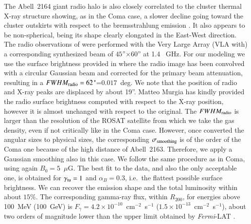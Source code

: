 \documentclass[traditabstract]{aa}
\begin{document}
The Abell~2164 giant radio halo is also closely correlated to the cluster thermal X-ray structure showing, as in the Coma case, a slower decline going toward the cluster outskirts with respect to the bremsstrahlung emission \citep{2001A&A...373..106F}. It also appears to be non-spherical, being its shape clearly elongated in the East-West direction. The radio observations of \cite{2001A&A...373..106F} were performed with the Very Large Array (VLA with) a corresponding synthesized beam of $45$''$\times60$'' at 1.4 ~GHz. For our modeling we use the surface brightness provided in \cite{2009A&A...499..679M} where the radio image has been convolved with a circular Gaussian beam and corrected for the primary beam attenuation, resulting in a $FWHM_{\rm{radio}}=62$"=$0.017$~deg. We note that the position of radio and X-ray peaks are displaced by about 19''. Matteo Murgia has kindly provided the radio surface brightness computed with respect to the \cite{2002ApJ...567..716R} X-ray position, however it is almost unchanged with respect to the original. The $FWHM_{\rm{radio}}$ is larger than the resolution of the ROSAT satellite from which we take the gas density, even if not critically like in the Coma case. However, once converted the angular sizes to physical sizes, the corresponding $\sigma_{\rm{smoothing}}$ is of the order of the Coma one because of the high distance of Abell~2163. Therefore, we apply a Gaussian smoothing also in this case. We follow the same procedure as in Coma, using again $B_{0}=5$~$\mu$G. The best fit to the data, and also the only acceptable one, is obtained for $\gamma_{\rm{tu}}=1$ and $\alpha_B=0.3$, i.e.~the flattest possible surface brightness. We can recover the emission shape and the total luminosity within about $15\%$. The corresponding gamma-ray flux, within $R_{200}$, for energies above 100~MeV (100~GeV) is $F_{\gamma} = 4.2 \times 10^{-10}$~cm$^{-2}$~s$^{-1}$ ($1.5 \times 10^{-13}$~cm$^{-2}$~s$^{-1}$), about two orders of magnitude lower than the upper limit obtained by \emph{Fermi}-LAT \citep{2010ApJ...717L..71A}.
\end{document}
